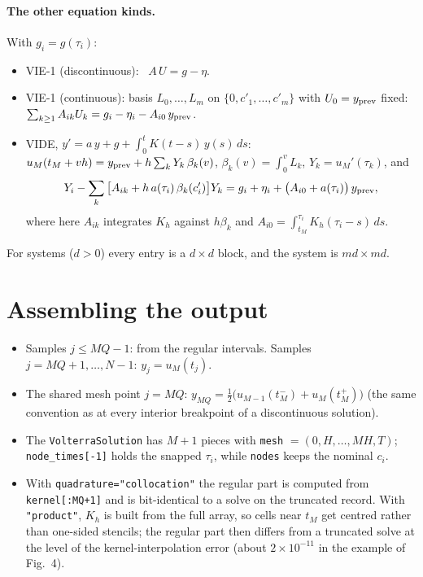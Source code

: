 \documentclass[10pt,a4paper]{article}
\newcommand{\code}[1]{\texttt{\small #1}}
\begin{document}
\paragraph{The other equation kinds.} With $g_i = g(\tau_i)$:
\begin{itemize}\setlength\itemsep{2pt}
\item VIE-1 (discontinuous): \ $A\,U = g - \eta$.
\item VIE-1 (continuous): basis $L_0,\dots,L_m$ on $\{0,c'_1,\dots,c'_m\}$ with $U_0 = y_{\rm prev}$ fixed:
  $\sum_{k\ge1}A_{ik}U_k = g_i - \eta_i - A_{i0}\,y_{\rm prev}$.
\item VIDE, $y' = a\,y + g + \int_0^t K(t-s)\,y(s)\,ds$: \
  $u_M(t_M+vh) = y_{\rm prev} + h\sum_k Y_k\,\beta_k(v)$, $\beta_k(v) = \int_0^v L_k$, $Y_k = u_M'(\tau_k)$, and
  \[
    Y_i - \sum_k\big[A_{ik} + h\,a(\tau_i)\,\beta_k(c'_i)\big]Y_k = g_i + \eta_i + \big(A_{i0} + a(\tau_i)\big)\,y_{\rm prev},
  \]
  where here $A_{ik}$ integrates $K_h$ against $h\beta_k$ and $A_{i0} = \int_{t_M}^{\tau_i}K_h(\tau_i-s)\,ds$.
\end{itemize}
For systems ($d>0$) every entry is a $d\times d$ block, and the system is $md\times md$.

\section{Assembling the output}

\begin{itemize}\setlength\itemsep{2pt}
\item Samples $j \le MQ-1$: from the regular intervals. Samples $j = MQ+1,\dots,N-1$: $y_j = u_M(t_j)$.
\item The shared mesh point $j = MQ$: $y_{MQ} = \tfrac12\big(u_{M-1}(t_M^-) + u_M(t_M^+)\big)$
  (the same convention as at every interior breakpoint of a discontinuous solution).
\item The \code{VolterraSolution} has $M+1$ pieces with \code{mesh} $= (0, H, \dots, MH, T)$;
  \code{node\_times[-1]} holds the snapped $\tau_i$, while \code{nodes} keeps the nominal $c_i$.
\item With \code{quadrature="collocation"} the regular part is computed from \code{kernel[:MQ+1]}
  and is bit-identical to a solve on the truncated record. With \code{"product"}, $K_h$ is built
  from the full array, so cells near $t_M$ get centred rather than one-sided stencils; the regular
  part then differs from a truncated solve at the level of the kernel-interpolation error
  (about $2\times10^{-11}$ in the example of Fig.~4).
\end{itemize}
\end{document}
